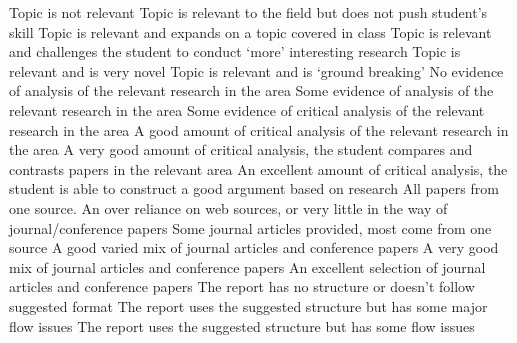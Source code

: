 \documentclass{../fal_assignment}
\begin{document}
\begin{markingrubric}
%
	\grade\fail Topic is not relevant
	\grade Topic is relevant to the field but does not push student's skill
	\grade Topic is relevant and expands on a topic covered in class
	\grade Topic is relevant and challenges the student to conduct `more' interesting research
	\grade Topic is relevant and is very novel
	\grade Topic is relevant and is `ground breaking'
%
%
        \grade\fail No evidence of analysis of the relevant research in the area
        \grade Some evidence of analysis of the relevant research in the area
        \grade Some evidence of critical analysis of the relevant research in the area
        \grade A good amount of critical analysis of the relevant research in the area
        \grade A very good amount of critical analysis, the student compares and contrasts papers in the relevant area
        \grade An excellent amount of critical analysis, the student is able to construct a good argument based on research
%
        \grade\fail All papers from one source.
        \grade An over reliance on web sources, or very little in the way of journal/conference papers 
        \grade Some journal articles provided, most come from one source
        \grade A good varied mix of journal articles and conference papers
        \grade A very good mix of journal articles and conference papers
        \grade An excellent selection of journal articles and conference papers
%            
        \grade\fail The report has no structure or doesn't follow suggested format
        \grade The report uses the suggested structure but has some major flow issues
        \grade The report uses the suggested structure but has some flow issues

\end{markingrubric}
\end{document}
